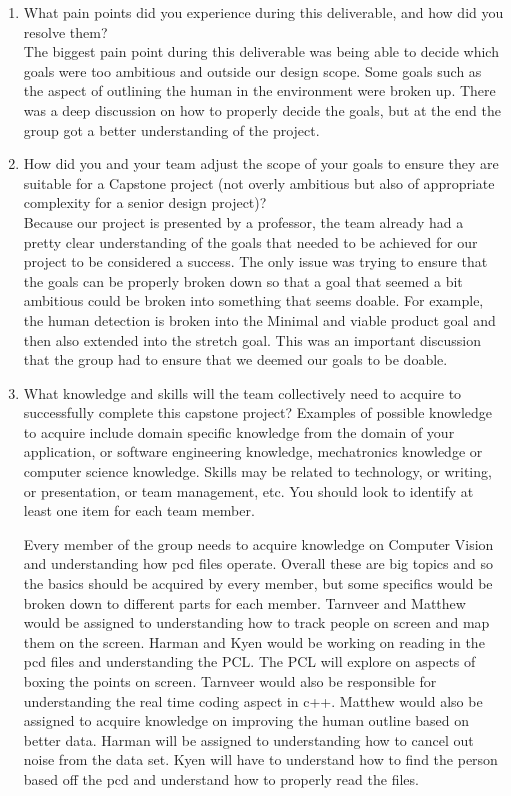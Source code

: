 \begin{enumerate}
\item What pain points did you experience during this deliverable, and how
did you resolve them?\\

The biggest pain point during this deliverable was being able to decide which goals were too ambitious and outside our design scope. Some goals such as the aspect of outlining the human 
in the environment were broken up. There was a deep discussion on how to properly decide the goals, but at the end the  group got a better understanding of the project.

\item How did you and your team adjust the scope of your goals to ensure
they are suitable for a Capstone project (not overly ambitious but also of
appropriate complexity for a senior design project)?\\

Because our project is presented by a professor, the team already had a pretty clear understanding of the goals that needed to be achieved for our project to be considered a success.
 The only issue was trying to ensure that the goals can be properly broken down so that a goal that seemed a bit ambitious could be broken into something that seems doable. For example, 
 the human detection is broken into the Minimal and viable product goal and then also extended into the stretch goal. This was an important discussion that the group had to ensure that we 
 deemed our goals to be doable.

\item What knowledge and skills will the team collectively need to acquire to successfully complete this capstone project?  Examples of possible knowledge to acquire include domain specific knowledge 
from the domain of your application, or software engineering knowledge, mechatronics knowledge or computer science knowledge.  Skills may be related to technology, or writing, or presentation, 
or team management, etc.  You should look to identify at least one item for each team member.

Every member of the group needs to acquire knowledge on Computer Vision and understanding how pcd files operate. Overall these are big topics and so the basics should be acquired by every member, but 
some specifics would be broken down to different parts for each member. Tarnveer and Matthew would be assigned to understanding how to track people on screen and map them on the screen. Harman and Kyen 
would be working on reading in the pcd files and understanding the PCL. The PCL will explore on aspects of boxing the points on screen. Tarnveer would also be responsible for understanding
the real time coding aspect in c++. Matthew would also be assigned to acquire knowledge on improving the human outline based on better data. Harman will be assigned to understanding how to cancel out noise
from the data set. Kyen will have to understand how to find the person based off the pcd and understand how to properly read the files.


\end{enumerate}
